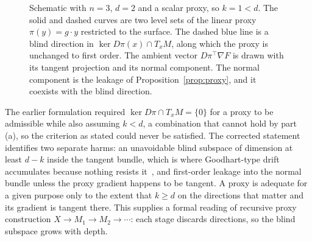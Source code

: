 \documentclass[11pt,a4paper]{article}
\theoremstyle{definition}
\theoremstyle{remark}
\newcommand{\TM}[1]{T_{#1}M}
\begin{document}
\begin{figure}[ht]
\caption{Schematic with $n=3$, $d=2$ and a scalar proxy, so $k=1<d$. The
solid and dashed curves are two level sets of the linear proxy
$\pi(y)=g\cdot y$ restricted to the surface. The dashed blue line is a blind
direction in $\ker D\pi(x)\cap\TM{x}$, along which the proxy is unchanged to
first order. The ambient vector $D\pi^\top\nabla F$ is drawn with its tangent
projection and its normal component. The normal component is the leakage of
Proposition~\ref{prop:proxy}, and it coexists with the blind direction.}
\label{fig:proxy}
\end{figure}

The earlier formulation required $\ker D\pi\cap\TM{x}=\{0\}$ for a proxy to be
admissible while also assuming $k<d$, a combination that cannot hold by
part (a), so the criterion as stated could never be satisfied. The corrected
statement identifies two separate harms: an unavoidable blind subspace of
dimension at least $d-k$ inside the tangent bundle, which is where Goodhart-type
drift accumulates because nothing resists it~\cite{manheim2018goodhart}, and
first-order leakage into the normal bundle unless the proxy gradient happens
to be tangent. A proxy is adequate for a given purpose only to the extent that
$k\ge d$ on the directions that matter and its gradient is tangent there. This
supplies a formal reading of recursive proxy construction
$X\to M_1\to M_2\to\cdots$: each stage discards directions, so the blind
subspace grows with depth.
\end{document}
